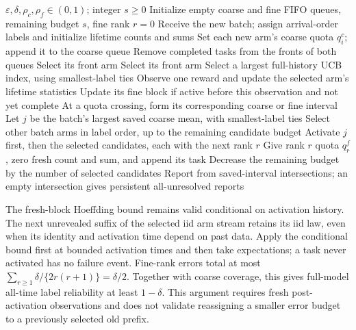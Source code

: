 \documentclass[11pt]{article}
\theoremstyle{remark}
\begin{document}
\begin{algorithm}[p]
\caption{Activation-Budgeted Maintenance (ABM)}
\label{alg:abm}
\begin{algorithmic}[1]
\Require $\varepsilon,\delta,\rho_c,\rho_f\in(0,1)$; integer $s\ge0$
\State Initialize empty coarse and fine FIFO queues, remaining budget $s$, fine rank $r=0$
 \State Receive the new batch; assign arrival-order labels and initialize lifetime counts and sums
 \State Set each new arm's coarse quota $q_i^c$; append it to the coarse queue
 \State Remove completed tasks from the fronts of both queues
   \State Select its front arm
   \State Select its front arm
 \Else
   \State Select a largest full-history UCB index, using smallest-label ties
 \EndIf
 \State Observe one reward and update the selected arm's lifetime statistics
 \State Update its fine block if active before this observation and not yet complete
 \State At a quota crossing, form its corresponding coarse or fine interval
   \State Let $j$ be the batch's largest saved coarse mean, with smallest-label ties
   \State Select other batch arms in label order, up to the remaining candidate budget
     \State Activate $j$ first, then the selected candidates, each with the next rank $r$
     \State Give rank $r$ quota $q_r^f$, zero fresh count and sum, and append its task
     \State Decrease the remaining budget by the number of selected candidates
   \EndIf
 \EndIf
 \State Report from saved-interval intersections; an empty intersection gives persistent all-unresolved reports
\EndFor
\end{algorithmic}
\end{algorithm}

The fresh-block Hoeffding bound remains valid conditional on activation
history. The next unrevealed suffix of the selected iid arm stream
retains its iid law, even when its identity and activation time depend
on past data. Apply the conditional bound first at bounded activation
times and then take expectations; a task never activated has no failure
event. Fine-rank errors total at most
$\sum_{r\ge1}\delta/\{2r(r+1)\}=\delta/2$.
Together with coarse coverage, this gives full-model all-time label
reliability at least $1-\delta$. This argument requires fresh
post-activation observations and does not validate reassigning a
smaller error budget to a previously selected old prefix.
\end{document}
